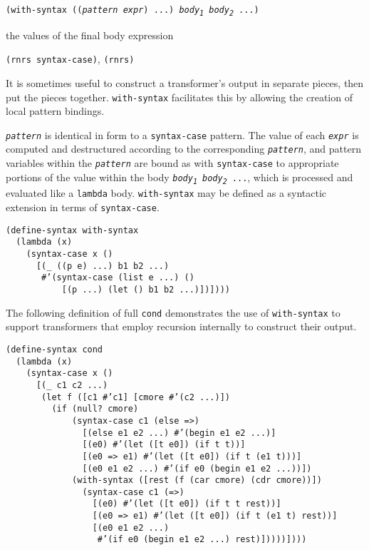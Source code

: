 \begin{description}

\label{syntax_s38}\item[syntax] \texttt{(with-syntax ((\textit{pattern} \textit{expr}) ...) \textit{body\textsubscript{1}} \textit{body\textsubscript{2}} ...)}



\item[returns] the values of the final body expression


\item[libraries] \texttt{(rnrs syntax-case)}, \texttt{(rnrs)}
\end{description}


It is sometimes useful to construct a transformer's output in separate
pieces, then put the pieces together.
\texttt{with-syntax} facilitates this by allowing the creation of local
pattern bindings.

\texttt{\textit{pattern}} is identical in form to a \texttt{syntax-case} pattern.
The value of each \texttt{\textit{expr}} is computed and destructured according
to the corresponding \texttt{\textit{pattern}}, and pattern variables within
the \texttt{\textit{pattern}} are bound as with \texttt{syntax-case} to appropriate
portions of the value within the body \texttt{\textit{body\textsubscript{1}} \textit{body\textsubscript{2}} ...},
which is processed and evaluated like a \texttt{lambda} body.
\texttt{with-syntax} may be defined as a syntactic extension in terms of
\texttt{syntax-case}.

\begin{alltt}
(define-syntax with-syntax
  (lambda (x)
    (syntax-case x ()
      [(\_{} ((p e) ...) b1 b2 ...)
       \#{}'(syntax-case (list e ...) ()
           [(p ...) (let () b1 b2 ...)])])))
\end{alltt}


The following definition of full \label{syntax_s39}\texttt{cond}
demonstrates the use of \texttt{with-syntax} to support transformers
that employ recursion internally to construct their output.


\begin{alltt}
(define-syntax cond\label{syntax_defn_cond}
  (lambda (x)
    (syntax-case x ()
      [(\_{} c1 c2 ...)
       (let f ([c1 \#{}'c1] [cmore \#{}'(c2 ...)])
         (if (null? cmore)
             (syntax-case c1 (else =\textgreater{})
               [(else e1 e2 ...) \#{}'(begin e1 e2 ...)]
               [(e0) \#{}'(let ([t e0]) (if t t))]
               [(e0 =\textgreater{} e1) \#{}'(let ([t e0]) (if t (e1 t)))]
               [(e0 e1 e2 ...) \#{}'(if e0 (begin e1 e2 ...))])
             (with-syntax ([rest (f (car cmore) (cdr cmore))])
               (syntax-case c1 (=\textgreater{})
                 [(e0) \#{}'(let ([t e0]) (if t t rest))]
                 [(e0 =\textgreater{} e1) \#{}'(let ([t e0]) (if t (e1 t) rest))]
                 [(e0 e1 e2 ...)
                  \#{}'(if e0 (begin e1 e2 ...) rest)]))))])))
\end{alltt}

